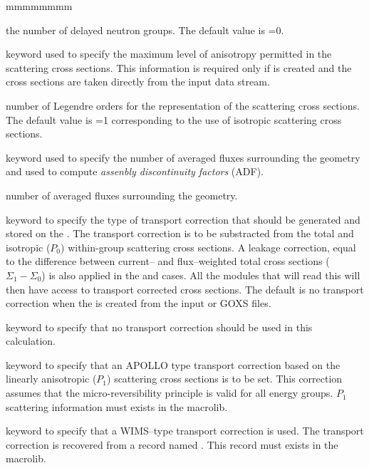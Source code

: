 \begin{ListeDeDescription}{mmmmmmmm}
\item[\dusa{ndel}] the number of delayed neutron groups. The
default value is =0.

\item[\moc{ANIS}] keyword used to specify the maximum level of anisotropy
permitted in the scattering cross sections. This information is required only if
 is created and the cross sections are taken directly from the
input data stream.

\item[\dusa{naniso}] number of Legendre orders for the representation of the
scattering cross sections. The default value is =1 corresponding to
the use of isotropic scattering cross sections.

\item[\moc{NADF}] keyword used to specify the number of averaged fluxes surrounding the geometry and used
to compute {\sl assenbly discontinuity factors} (ADF).

\item[\dusa{nadf}] number of averaged fluxes surrounding the geometry.

\item[\moc{CTRA}] keyword to specify the type of transport correction that
should be generated and stored on the . The transport correction is to be
substracted from the total and isotropic ($P_0$) within-group scattering cross sections. A leakage correction, equal 
to the difference between current-- and flux--weighted total cross sections ($\Sigma_{1}-\Sigma_{0}$)
is also applied in the  and  cases. All the modules that
will read this  will then have access to transport corrected
cross sections. The default is no transport correction when the  is created from the
input or GOXS files. 

\item[\moc{NONE}] keyword to specify that no transport correction should be
used in this calculation.

\item[\moc{APOL}] keyword to specify that an APOLLO type transport correction
based on the linearly anisotropic ($P_1$) scattering cross sections is to be set. This correction assumes that
the micro-reversibility principle is valid for all energy groups. $P_1$ scattering
information must exists in the {\sc macrolib}.

\item[\moc{WIMS}] keyword to specify that a WIMS--type transport correction is used.
The transport correction is recovered from a record named . This
record must exists in the {\sc macrolib}.


\end{ListeDeDescription}

